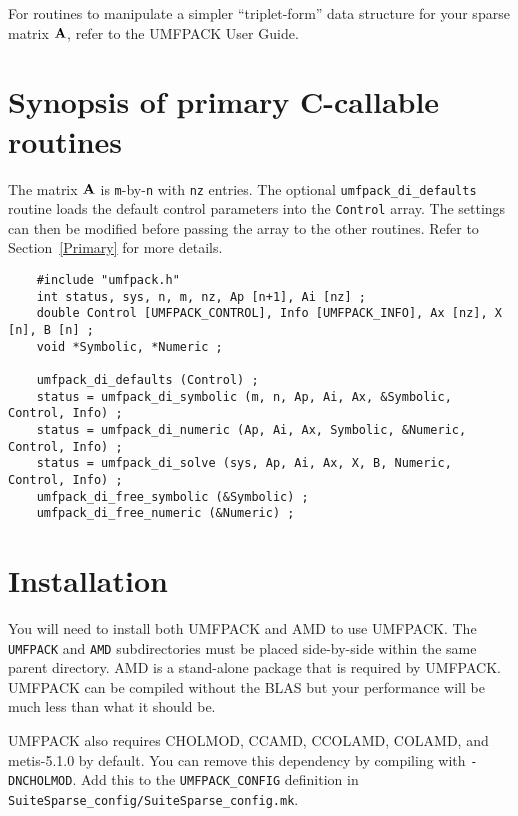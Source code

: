 \documentclass[11pt]{article}
\newcommand{\m}[1]{{\bf{#1}}}       %
\begin{document}
For routines to manipulate a simpler ``triplet-form'' data structure for your
sparse matrix $\m{A}$, refer to the UMFPACK User Guide.

\section{Synopsis of primary C-callable routines}
\label{Synopsis}

The matrix $\m{A}$ is {\tt m}-by-{\tt n} with {\tt nz} entries.
The optional {\tt umfpack\_di\_defaults} routine loads the default control
parameters into the {\tt Control} array.  The settings can then be modified
before passing the array to the other routines.  Refer to Section~\ref{Primary}
for more details.

{\footnotesize
\begin{verbatim}
    #include "umfpack.h"
    int status, sys, n, m, nz, Ap [n+1], Ai [nz] ;
    double Control [UMFPACK_CONTROL], Info [UMFPACK_INFO], Ax [nz], X [n], B [n] ;
    void *Symbolic, *Numeric ;

    umfpack_di_defaults (Control) ;
    status = umfpack_di_symbolic (m, n, Ap, Ai, Ax, &Symbolic, Control, Info) ;
    status = umfpack_di_numeric (Ap, Ai, Ax, Symbolic, &Numeric, Control, Info) ;
    status = umfpack_di_solve (sys, Ap, Ai, Ax, X, B, Numeric, Control, Info) ;
    umfpack_di_free_symbolic (&Symbolic) ;
    umfpack_di_free_numeric (&Numeric) ;
\end{verbatim}
}

\section{Installation}
\label{Install}

You will need to install both UMFPACK and AMD to use UMFPACK.
The {\tt UMFPACK} and {\tt AMD} subdirectories must be placed side-by-side
within the same parent directory.  AMD is a stand-alone package that
is required by UMFPACK.  UMFPACK can be compiled without the
BLAS
but your performance will be much less than what it should be.

UMFPACK also requires CHOLMOD, CCAMD, CCOLAMD, COLAMD, and metis-5.1.0
by default.  You can remove this dependency by compiling with
{\tt -DNCHOLMOD}.  Add this to the {\tt UMFPACK\_CONFIG} definition
in {\tt SuiteSparse\_config/SuiteSparse\_config.mk}.
\end{document}
